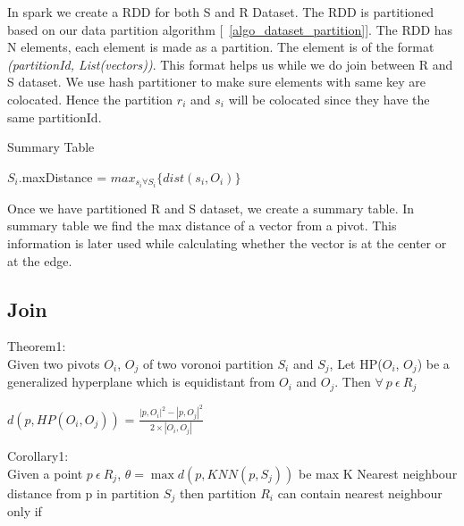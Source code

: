 In spark we create a RDD for both S and R Dataset. The RDD is
partitioned based on our data partition algorithm
[~\ref{algo_dataset_partition}]. The RDD has N elements, each element is
made as a partition. The element is of
the format \emph{(partitionId, List(vectors))}. This format helps us
while we do join between R and S dataset. We use hash partitioner to
make sure elements with same key are colocated. Hence the partition $r_i$ and
$s_i$ will be colocated since they have the same partitionId.

\medskip

\begin{algorithm}
  \caption{Summary Table}
  \label{algo_generate_summary}
  \begin{algorithmic}[1]
    \STATE $S_i$.maxDistance = $max_{s_i \forall S_i}\{dist(s_i, O_i)\}$
    \ENDFOR
  \end{algorithmic}
\end{algorithm}

Once we have partitioned R and S dataset, we create a summary
table. In summary table we find the max distance of a vector from a
pivot. This information is later used while calculating whether the
vector is at the center or at the edge.

\subsection{Join}

\medskip

Theorem1: \cite{lu_efficient_2012} \\

Given two pivots $O_i$, $O_j$ of two voronoi
partition $S_i$ and $S_j$, Let HP($O_i$, $O_j$) be a generalized
hyperplane which is equidistant from $O_i$ and $O_j$. Then $\forall\ p\
\epsilon\ R_j$

\medskip

\begin{center}

$d(p, HP(O_i, O_j))$ = $\frac{|p, O_i|^2 - |p, O_j|^2}{2 \times |O_i, O_j|}$

\end{center}

\bigskip

Corollary1: \\

Given a point $p\ \epsilon\ R_j$, $\theta = \max{d(p, KNN(p, S_j))}$ be max K Nearest
neighbour distance from p in partition $S_j$ then partition
$R_i$ can contain nearest neighbour only if

